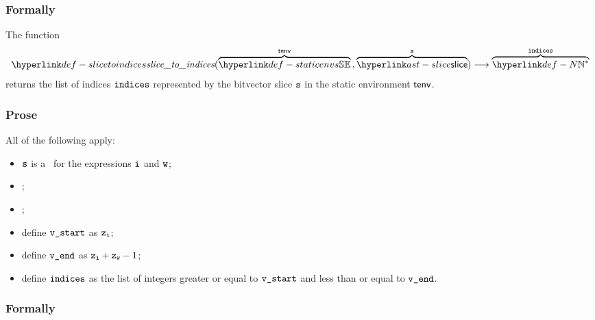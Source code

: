 \subsubsection{Formally}
\begin{mathpar}
\end{mathpar}

\hypertarget{def-slicetoindices}{}
The function
\[
\slicetoindices(\overname{\staticenvs}{\tenv} \aslsep \overname{\slice}{\vs}) \aslto \overname{\N^*}{\indices}
\]
returns the list of indices $\indices$ represented by the bitvector slice $\vs$ in the static environment $\tenv$.

\subsubsection{Prose}
All of the following apply:
\begin{itemize}
  \item $\vs$ is a \lengthslice\ for the expressions $\vi$ and $\vw$;
  \item {};
  \item {};
  \item define $\vstart$ as $\vz_\vi$;
  \item define $\vend$ as $\vz_\vi + \vz_\vw - 1$;
  \item define $\indices$ as the list of integers greater or equal to $\vstart$ and less than or equal to $\vend$.
\end{itemize}

\subsubsection{Formally}
\begin{mathpar}
\end{mathpar}
